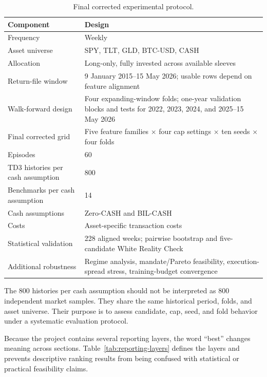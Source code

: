 \documentclass[11pt]{article}
\newcommand{\cashzero}{Zero-CASH}
\newcommand{\cashbil}{BIL-CASH}
\begin{document}
\begin{table}[htbp]
\centering
\caption{Final corrected experimental protocol.}
\label{tab:protocol}
\small
\begin{tabularx}{0.92\textwidth}{L{0.34\textwidth} Y}
\toprule
Component & Design \\
\midrule
Frequency & Weekly \\
Asset universe & SPY, TLT, GLD, BTC-USD, CASH \\
Allocation & Long-only, fully invested across available sleeves \\
Return-file window & 9 January 2015--15 May 2026; usable rows depend on feature alignment \\
Walk-forward design & Four expanding-window folds; one-year validation blocks and tests for 2022, 2023, 2024, and 2025--15 May 2026 \\
Final corrected grid & Five feature families $\times$ four cap settings $\times$ ten seeds $\times$ four folds \\
Episodes & 60 \\
TD3 histories per cash assumption & 800 \\
Benchmarks per cash assumption & 14 \\
Cash assumptions & \cashzero{} and \cashbil{} \\
Costs & Asset-specific transaction costs \\
Statistical validation & 228 aligned weeks; pairwise bootstrap and five-candidate White Reality Check \\
Additional robustness & Regime analysis, mandate/Pareto feasibility, execution-spread stress, training-budget convergence \\
\bottomrule
\end{tabularx}
\end{table}

The 800 histories per cash assumption should not be interpreted as 800 independent market samples. They share the same historical period, folds, and asset universe. Their purpose is to assess candidate, cap, seed, and fold behavior under a systematic evaluation protocol.

Because the project contains several reporting layers, the word ``best'' changes meaning across sections. Table~\ref{tab:reporting-layers} defines the layers and prevents descriptive ranking results from being confused with statistical or practical feasibility claims.
\end{document}
